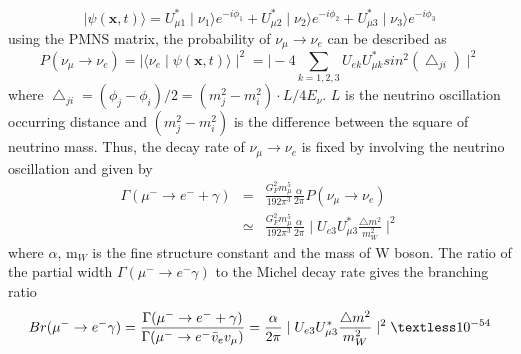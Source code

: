 \begin{equation}
 \mid\psi(\mathbf{x}, t)\rangle = U_{\mu1}^* \mid\nu_1\rangle e^{-i\phi_1} + U_{\mu2}^* \mid\nu_2\rangle e^{-i\phi_2} + U_{\mu3}^* \mid\nu_3\rangle e^{-i\phi_3}
\end{equation}
using the PMNS matrix, the probability of $\nu_\mu \rightarrow \nu_e$ can be described as
\begin{equation}
 P(\nu_\mu \rightarrow \nu_e) = \mid\langle\nu_e\mid\psi(\mathbf{x},t)\rangle\mid^2 = \mid-4\sum_{k=1,2,3}U_{ek}U^*_{\mu k}sin^2(\bigtriangleup_{ji})\mid^2
\end{equation}
where $\bigtriangleup_{ji} = (\phi_j-\phi_i)/2 = (m_j^2-m_i^2)\cdot L/4E_\nu$.
$L$ is the neutrino oscillation occurring distance and $(m_j^2-m_i^2)$ is the difference between the square of neutrino mass.
Thus, the decay rate of $\nu_\mu \rightarrow \nu_e$ is fixed by involving the neutrino oscillation and given by
\begin{eqnarray}
 \Gamma(\mu^- \rightarrow e^- + \gamma) &=& \frac{G_F^2 m_\mu^5}{192\pi^3}\frac{\alpha}{2\pi} P(\nu_\mu \rightarrow \nu_e) \nonumber \\
 &\simeq& \frac{G_F^2 m_\mu^5}{192\pi^3}\frac{\alpha}{2\pi}\mid U_{e3}U_{\mu3}^*\frac{\bigtriangleup m^2}{m_W^2}\mid^2
\end{eqnarray}
where $\alpha$, m$_W$ is the fine structure constant and the mass of W boson.
The ratio of the partial width $\Gamma(\mu^- \rightarrow e^-\gamma)$ to the Michel decay rate gives the branching ratio
\begin{equation}
 Br(\mu^- \rightarrow e^- \gamma) = \frac{\Gamma(\mu^- \rightarrow e^- + \gamma)}{\Gamma (\mu^- \rightarrow e^- \bar v_e v_\mu)} = \frac{\alpha}{2\pi}\mid U_{e3}U^*_{\mu3}\frac{\bigtriangleup m^2}{m_W^2}\mid^2 \textless 10^{-54}
\end{equation}

\newpage
